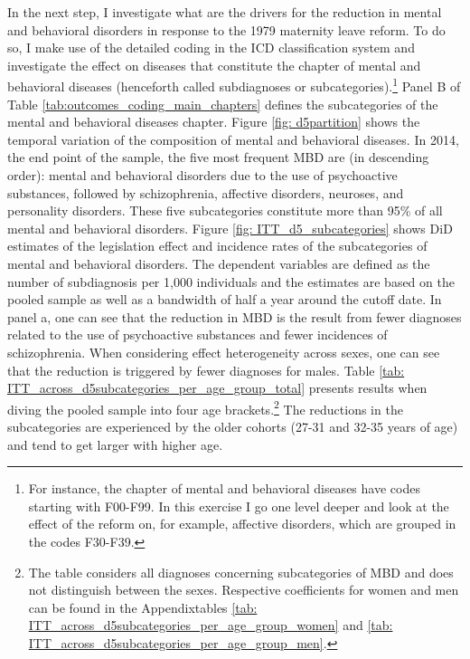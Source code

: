\documentclass[11pt, a4paper,draft]{article} %
\begin{document}
In the next step, I investigate what are the drivers for the reduction in mental and behavioral disorders in response to the 1979 maternity leave reform. To do so, I make use of the detailed coding in the ICD classification system and investigate the effect on diseases that constitute the chapter of mental and behavioral diseases (henceforth called subdiagnoses or subcategories).\footnote{For instance, the chapter of mental and behavioral diseases have codes starting with F00-F99. In this exercise I go one level deeper and look at the effect of the reform on, for example, affective disorders, which are grouped in the codes F30-F39.} Panel B of Table \ref{tab:outcomes_coding_main_chapters} defines the subcategories of the mental and behavioral diseases chapter. Figure \ref{fig: d5partition} shows the temporal variation of the composition of mental and behavioral diseases. In 2014, the end point of the sample, the five most frequent MBD are (in descending order): mental and behavioral disorders due to the use of psychoactive substances, followed by schizophrenia, affective disorders, neuroses, and personality disorders. These five subcategories constitute more than 95\% of all mental and behavioral disorders. Figure \ref{fig: ITT_d5_subcategories} shows DiD estimates of the legislation effect and incidence rates of the subcategories of mental and behavioral disorders. The dependent variables are defined as the number of subdiagnosis per 1,000 individuals and the estimates are based on the pooled sample as well as a bandwidth of half a year around the cutoff date. In panel a, one can see that the reduction in MBD is the result from fewer diagnoses related to the use of psychoactive substances and fewer incidences of schizophrenia. When considering effect heterogeneity across sexes, one can see that the reduction is triggered by fewer diagnoses for males. Table \ref{tab: ITT_across_d5subcategories_per_age_group_total} presents results when diving the pooled sample into four age brackets.\footnote{The table considers all diagnoses concerning subcategories of MBD and does not distinguish between the sexes. Respective coefficients for women and men can be found in the Appendixtables \ref{tab: ITT_across_d5subcategories_per_age_group_women} and \ref{tab: ITT_across_d5subcategories_per_age_group_men}.} The reductions in the subcategories are experienced by the older cohorts (27-31 and 32-35 years of age) and tend to get larger with higher age. 



\end{document}
